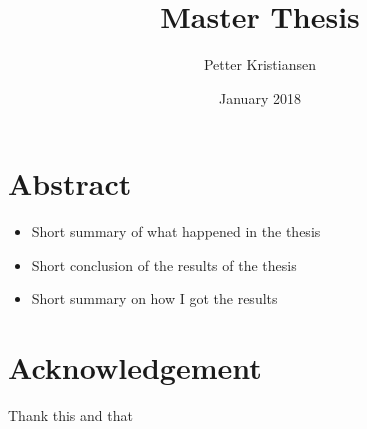 \documentclass[a4paper,12pt,oneside]{book}
\title{Master Thesis}
\author{Petter Kristiansen}
\date{January 2018}
\begin{document}
\maketitle

\newpage
\newpage

\section*{Abstract}
\begin{itemize}
    \item Short summary of what happened in the thesis
    \item Short conclusion of the results of the thesis
    \item Short summary on how I got the results
\end{itemize}

\newpage

\tableofcontents

\newpage

\section*{Acknowledgement}
Thank this and that

\newpage










%
%
\printbibliography
\begin{appendices}

\end{appendices}
\end{document}
